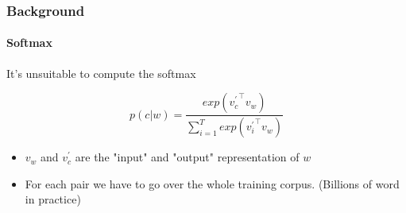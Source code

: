 \begin{frame}\frametitle{Background}\framesubtitle{Softmax}
\begin{Large}
It's unsuitable to compute the softmax
\end{Large}
   \begin{equation}
  p(c|w) =  \frac{exp( {v^{'}_c}^\intercal v_w )}{\sum_{i=1}^T exp({v^{'}_i}^\intercal v_{w})}
   \end{equation}
   \begin{itemize}
   \item $v_w$ and $v^{'}_c$ are the "input" and "output" representation of $w$
\item For each pair we have to go over the whole training corpus. (Billions of word in practice) 
   \end{itemize}
\end{frame}